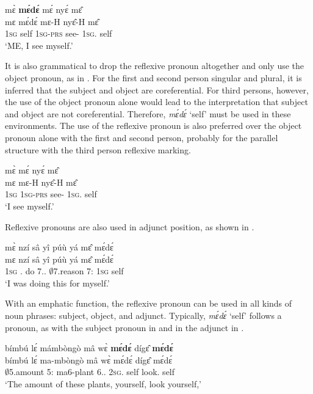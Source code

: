  \ea \label{medeax}
  \glll  mɛ̀ {\bfseries mɛ́dɛ́} mɛ́  nyɛ́ mɛ̂ \\
          mɛ mɛ́dɛ́ mɛ-H nyɛ̂-H mɛ̂   \\
        1\textsc{sg} self 1\textsc{sg}-\textsc{prs} see-{\R} 1\textsc{sg}.{\OBJ} self   \\
    \trans `ME, I see myself.'
\z   


It is also grammatical to drop the reflexive pronoun altogether and only use the object pronoun, as in . For the first and second person singular and plural, it is inferred that the subject and object are coreferential. For third persons, however, the use of the object pronoun alone would lead to the interpretation that subject and object are not coreferential. Therefore, {\itshape mɛ́dɛ́} `self' must be used in these environments. The use of the reflexive pronoun is also preferred over the object pronoun alone with the first and second person, probably for the parallel structure with the third person reflexive marking. 

 \ea \label{medesans}
  \glll  mɛ̀ mɛ́  nyɛ́ mɛ̂ \\
          mɛ mɛ-H nyɛ̂-H mɛ̂   \\
        1\textsc{sg} 1\textsc{sg}-\textsc{prs} see-{\R} 1\textsc{sg}.{\OBJ} self   \\
    \trans `I see myself.'
\z
    
Reflexive pronouns are also used in adjunct position, as shown in .   

 \ea \label{refladj}
  \glll mɛ̀ nzí sâ yî púù yá mɛ̂ mɛ́dɛ́ \\
        mɛ  nzí sâ yî púù yá mɛ̂ mɛ́dɛ́ \\
        1\textsc{sg} {\PROG}.{\PST} do 7.{\DEM}.{\PROX} $\emptyset$7.reason 7:{\ATT} 1\textsc{sg} self \\
    \trans `I was doing this for myself.'
\z    

With an emphatic function, the reflexive pronoun can be used in all kinds of noun phrases: subject, object, and adjunct.  Typically, {\itshape mɛ́dɛ́} `self' follows a pronoun, as with the subject pronoun in  and in the adjunct in .

\ea \label{mede1}
  \glll bímbú lɛ́ mámbòngò mâ wɛ̀ {\bfseries mɛ́dɛ́} dígɛ̂ {\bfseries mɛ́dɛ́} \\
         bímbú lɛ́ ma-mbòngò mâ wɛ̀ mɛ́dɛ́ dígɛ̂ mɛ́dɛ́ \\
       $\emptyset$5.amount 5:{\ATT} ma6-plant 6.{\DEM}.{\PROX} 2\textsc{sg}.{\SBJ} self look.{\IMP} self   \\
    \trans `The amount of these plants, yourself, look yourself,'
\z

